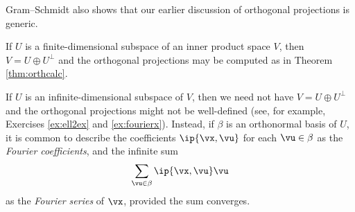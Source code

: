Gram--Schmidt also shows that our earlier discussion of orthogonal projections is generic.
  
\begin{cor}{}{}
If $U$ is a finite-dimensional subspace of an inner product space $V$, then $V=U\oplus U^\perp$ and the orthogonal projections may be computed as in Theorem \ref{thm:orthcalc}.
\end{cor}

If $U$ is an infinite-dimensional subspace of $V$, then we need not have $V=U\oplus U^\perp$ and the orthogonal projections might not be well-defined (see, for example, Exercises \ref{ex:ell2ex} and \ref{ex:fourierx}). Instead, if $\beta$ is an orthonormal basis of $U$, it is common to describe the coefficients $\ip{\vx,\vu}$ for each $\vu\in\beta$ as the \emph{Fourier coefficients}, and the infinite sum
\[\sum_{\vu\in\beta}\ip{\vx,\vu}\vu\]
as the \emph{Fourier series} of $\vx$, provided the sum converges.

